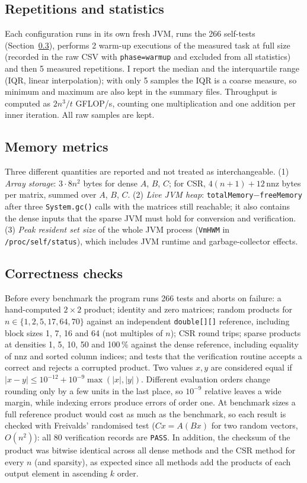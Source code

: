 \documentclass[11pt,a4paper]{article}
\begin{document}
\subsection{Repetitions and statistics}
Each configuration runs in its own fresh JVM, runs the 266 self-tests (Section~\ref{sec:correct}), performs 2 warm-up executions of the measured task at full size (recorded in the raw CSV with \texttt{phase=warmup} and excluded from all statistics) and then 5 measured repetitions. I report the median and the interquartile range (IQR, linear interpolation); with only 5 samples the IQR is a coarse measure, so minimum and maximum are also kept in the summary files. Throughput is computed as $2n^3/t$ GFLOP/s, counting one multiplication and one addition per inner iteration. All raw samples are kept.

\subsection{Memory metrics}
Three different quantities are reported and not treated as interchangeable. (1) \emph{Array storage}: $3\cdot 8n^2$ bytes for dense $A$, $B$, $C$; for CSR, $4(n+1)+12\,\mathrm{nnz}$ bytes per matrix, summed over $A$, $B$, $C$. (2) \emph{Live JVM heap}: \texttt{totalMemory}$-$\texttt{freeMemory} after three \texttt{System.gc()} calls with the matrices still reachable; it also contains the dense inputs that the sparse JVM must hold for conversion and verification. (3) \emph{Peak resident set size} of the whole JVM process (\texttt{VmHWM} in \texttt{/proc/self/status}), which includes JVM runtime and garbage-collector effects.

\subsection{Correctness checks}\label{sec:correct}
Before every benchmark the program runs 266 tests and aborts on failure: a hand-computed $2\times2$ product; identity and zero matrices; random products for $n\in\{1,2,5,17,64,70\}$ against an independent \texttt{double[][]} reference, including block sizes 1, 7, 16 and 64 (not multiples of $n$); CSR round trips; sparse products at densities 1, 5, 10, 50 and 100\,\% against the dense reference, including equality of nnz and sorted column indices; and tests that the verification routine accepts a correct and rejects a corrupted product. Two values $x,y$ are considered equal if $|x-y|\le 10^{-12}+10^{-9}\max(|x|,|y|)$. Different evaluation orders change rounding only by a few units in the last place, so $10^{-9}$ relative leaves a wide margin, while indexing errors produce errors of order one. At benchmark sizes a full reference product would cost as much as the benchmark, so each result is checked with Freivalds' randomised test \cite{freivalds1977} ($Cx=A(Bx)$ for two random vectors, $O(n^2)$): all 80 verification records are \texttt{PASS}. In addition, the checksum of the product was bitwise identical across all dense methods and the CSR method for every $n$ (and sparsity), as expected since all methods add the products of each output element in ascending $k$ order.
\end{document}
